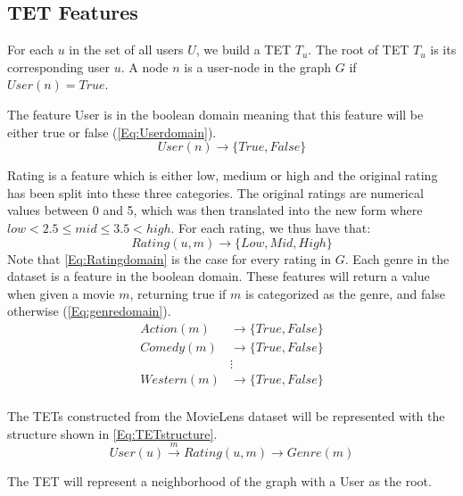 \subsection{TET Features}


For each $u$ in the set of all users $U$, we build a TET $T_u$. The root of TET $T_u$ is its corresponding user $u$.
A node $n$ is a user-node in the graph $G$ if $User(n) = True$.

The feature User is in the boolean domain meaning that this feature will be either true or false (\autoref{Eq:Userdomain}).
\begin{equation}\label{Eq:Userdomain}
  User(n)\rightarrow \{True, False\}
\end{equation}


Rating is a feature which is either low, medium or high and the original rating has been split into these three categories.
The original ratings are numerical values between 0 and 5, which was then translated into the new form where $low<2.5\leq mid \leq 3.5<high$.
For each rating, we thus have that:
\begin{equation}\label{Eq:Ratingdomain}
    Rating(u, m) \rightarrow \{Low, Mid, High\}
\end{equation}
Note that \autoref{Eq:Ratingdomain} is the case for every rating in $G$.
Each genre in the dataset is a feature in the boolean domain. These features will return a value when given a movie $m$, returning true if $m$ is categorized as the genre, and false otherwise (\autoref{Eq:genredomain}).
\begin{equation}\label{Eq:genredomain}
\begin{aligned}
Action(m)& \rightarrow \{True, False\} \\
Comedy(m)& \rightarrow \{True, False\} \\
&\vdots \\
Western(m)& \rightarrow \{True, False\} \\
\end{aligned}
\end{equation}

The TETs constructed from the MovieLens dataset will be represented with the structure shown in \autoref{Eq:TETstructure}.
\begin{equation}\label{Eq:TETstructure}
User(u) \stackrel{m}{\longrightarrow} Rating(u,m) \longrightarrow Genre(m)
\end{equation}

The TET will represent a neighborhood of the graph with a User as the root.

